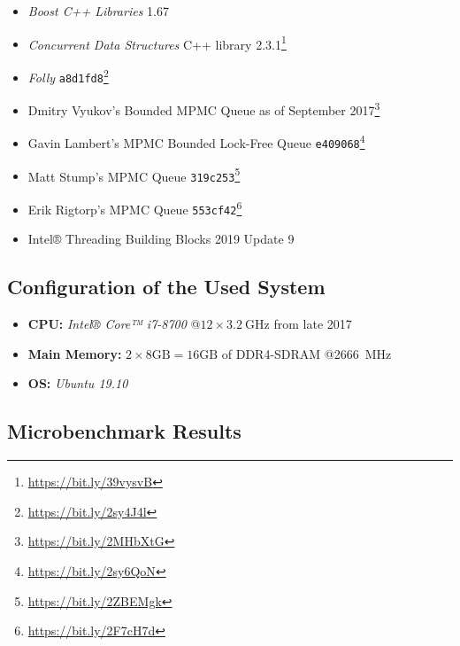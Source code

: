 \begin{@empty}
	\begin{itemize}
		\itemsep0em
		\item	\textit{Boost C++ Libraries} 1.67
		\item	\textit{Concurrent Data Structures} C++ library 2.3.1\footnote{\url{https://bit.ly/39vysvB}}
		\item	\textit{Folly} \texttt{a8d1fd8}\footnote{\url{https://bit.ly/2sy4J4l}}
		\item	Dmitry Vyukov's Bounded MPMC Queue as of September 2017\footnote{\url{https://bit.ly/2MHbXtG}}
		\item	Gavin Lambert's MPMC Bounded Lock-Free Queue \texttt{e409068}\footnote{\url{https://bit.ly/2sy6QoN}}
		\item	Matt Stump's MPMC Queue \texttt{319c253}\footnote{\url{https://bit.ly/2ZBEMgk}}
		\item	Erik Rigtorp's MPMC Queue \texttt{553cf42}\footnote{\url{https://bit.ly/2F7cH7d}}
		\item	Intel® Threading Building Blocks 2019 Update 9
	\end{itemize}
\end{@empty}

\subsection[System Configuration]{Configuration of the Used System} \label{subsec:free-list-system-configuration}

\begin{@empty}
	\begin{itemize}
		\itemsep0em
		\item	\textbf{CPU:} \emph{Intel® Core™ i7-8700} @$12 \times \SI{3.2}{\giga\hertz}$ from late 2017
		\item	\textbf{Main Memory:} $2 \times 8\text{GB} = 16\text{GB}$ of DDR4-SDRAM @\SI{2666}{\mega\hertz}
		\item	\textbf{OS:} \emph{Ubuntu 19.10}
	\end{itemize}
\end{@empty}

\subsection[Microbenchmark Results]{Microbenchmark Results} \label{subsec:free-list-results}

